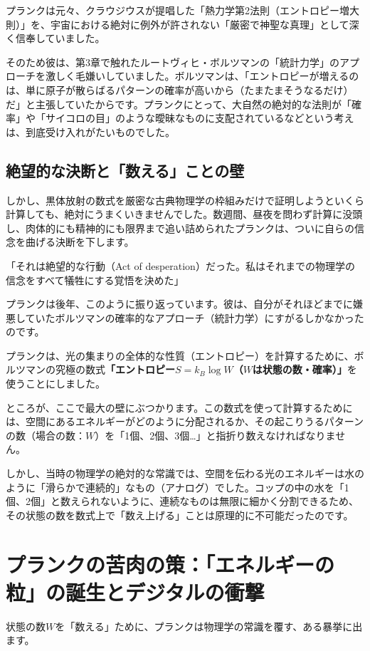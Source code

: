 プランクは元々、クラウジウスが提唱した「熱力学第2法則（エントロピー増大則）」を、宇宙における絶対に例外が許されない「厳密で神聖な真理」として深く信奉していました。

そのため彼は、第3章で触れたルートヴィヒ・ボルツマンの「統計力学」のアプローチを激しく毛嫌いしていました。ボルツマンは、「エントロピーが増えるのは、単に原子が散らばるパターンの確率が高いから（たまたまそうなるだけ）だ」と主張していたからです。プランクにとって、大自然の絶対的な法則が「確率」や「サイコロの目」のような曖昧なものに支配されているなどという考えは、到底受け入れがたいものでした。

\subsection{絶望的な決断と「数える」ことの壁}

しかし、黒体放射の数式を厳密な古典物理学の枠組みだけで証明しようといくら計算しても、絶対にうまくいきませんでした。数週間、昼夜を問わず計算に没頭し、肉体的にも精神的にも限界まで追い詰められたプランクは、ついに自らの信念を曲げる決断を下します。

「それは絶望的な行動（Act of desperation）だった。私はそれまでの物理学の信念をすべて犠牲にする覚悟を決めた」

プランクは後年、このように振り返っています。彼は、自分がそれほどまでに嫌悪していたボルツマンの確率的なアプローチ（統計力学）にすがるしかなかったのです。

プランクは、光の集まりの全体的な性質（エントロピー）を計算するために、ボルツマンの究極の数式\textbf{「エントロピー\(S = k_B \log W\)（\(W\)は状態の数・確率）」}を使うことにしました。

ところが、ここで最大の壁にぶつかります。この数式を使って計算するためには、空間にあるエネルギーがどのように分配されるか、その起こりうるパターンの数（場合の数：\(W\)）を「1個、2個、3個\ldots{}」と指折り数えなければなりません。

しかし、当時の物理学の絶対的な常識では、空間を伝わる光のエネルギーは水のように「滑らかで連続的」なもの（アナログ）でした。コップの中の水を「1個、2個」と数えられないように、連続なものは無限に細かく分割できるため、その状態の数を数式上で「数え上げる」ことは原理的に不可能だったのです。

\section{プランクの苦肉の策：「エネルギーの粒」の誕生とデジタルの衝撃}

状態の数\(W\)を「数える」ために、プランクは物理学の常識を覆す、ある暴挙に出ます。

